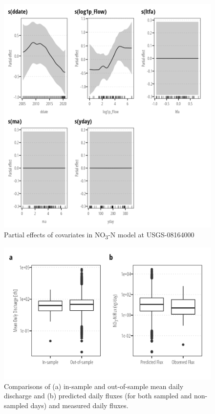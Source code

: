 \documentclass[
]{article}
\begin{document}
\begin{figure}[h]

{\centering \includegraphics{model_assessment_files/figure-pdf/unnamed-chunk-5-1.png}

}

\caption{Partial effects of covariates in NO\textsubscript{3}-N model at
USGS-08164000}

\end{figure}

\begin{figure}[h]

{\centering \includegraphics{model_assessment_files/figure-pdf/unnamed-chunk-6-1.png}

}

\caption{Comparisons of (a) in-sample and out-of-sample mean daily
discharge and (b) predicted daily fluxes (for both sampled and
non-sampled days) and measured daily fluxes.}

\end{figure}
\end{document}
